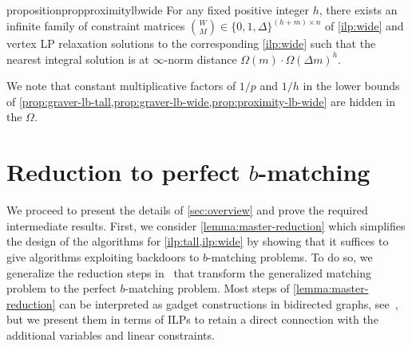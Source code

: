 \documentclass[a4paper,UKenglish,cleveref,thm-restate]{lipics-v2021}
\begin{document}
{\begin{restatable}{proposition}{propproximitylbwide}
    For any fixed positive integer $h$, there exists an infinite family of constraint matrices $\binom WM\in\{0,1,\Delta\}^{(h+m)\times n}$ of \cref{ilp:wide} and vertex LP relaxation solutions to the corresponding \cref{ilp:wide} such that the nearest integral solution is at $\infty$-norm distance $\Omega(m)\cdot\Omega(\Delta m)^h$.
    \label{prop:proximity-lb-wide}
\end{restatable}

We note that constant multiplicative factors of $1/p$ and $1/h$ in the lower bounds of \cref{prop:graver-lb-tall,prop:graver-lb-wide,prop:proximity-lb-wide} are hidden in the $\Omega$.

} 
\section[Reduction to perfect b-matching]{Reduction to perfect $b$-matching}
\label{sec:master-reduction}

We proceed to present the details of \cref{sec:overview} and prove the required intermediate results. First, we consider \cref{lemma:master-reduction} which simplifies the design of the algorithms for \cref{ilp:tall,ilp:wide} by showing that it suffices to give algorithms exploiting backdoors to $b$-matching problems. To do so, we generalize the reduction steps in~\cite{schrijver2003combinatorial} that transform the generalized matching problem to the perfect $b$-matching problem. Most steps of \cref{lemma:master-reduction} can be interpreted as gadget constructions in bidirected graphs, see~\cite{schrijver2003combinatorial}, but we present them in terms of ILPs to retain a direct connection with the additional variables and linear constraints.

\lemmamasterreduction*
\end{document}
